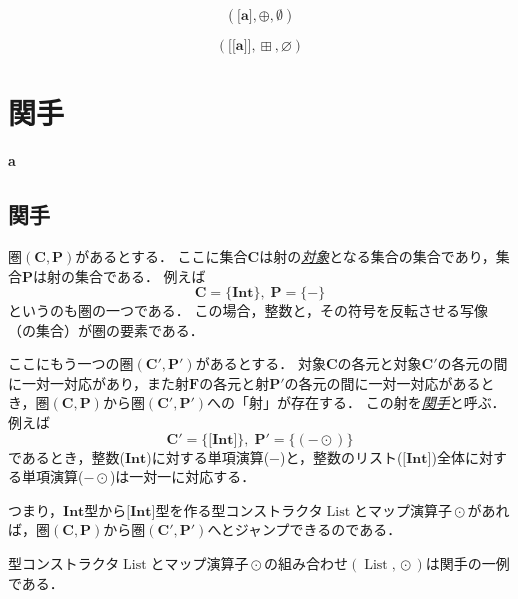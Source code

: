 \documentclass[twocolumn]{jsbook}
\def\[{[\![}
\def\]{]\!]}
\newcommand{\keyword}[1]{\underline{\emph{#1}}}
\newenvironment{leader}{\begingroup\bf}{\endgroup}
\newcommand{\hsklType}[1]{\textbf{#1}}
\newcommand{\hsklTypeConstructor}[1]{\mathop{\mathrm{#1}}}
\DeclareMathOperator{\hsklListConstructor}{\hsklTypeConstructor{List}}
\DeclareMathOperator{\hsklMap}{\odot}
\DeclareMathOperator{\hsklMaybeAppend}{\boxplus}
\newcommand{\hsklAppend}{\oplus}
\newcommand{\hsklEmptyList}{\emptyset}
\newcommand{\hsklInt}{\hsklType{Int}}
\newcommand{\hsklNothing}{\varnothing}
\newcommand{\hsklListType}[1]{\boldsymbol{[}#1\boldsymbol{]}}
\newcommand{\hsklMaybeType}[1]{\boldsymbol{\[}#1\boldsymbol{\]}}
\newcommand{\mathSet}[1]{\mathbf{#1}}
\newcommand{\mathCategoryShort}[2]{(#1,#2)}
\newcommand{\mathMonoid}[3]{(#1,#2,#3)}
\begin{document}
$$\mathMonoid{\hsklListType{\hsklType{a}}}{\hsklAppend}{\hsklEmptyList}$$

$$\mathMonoid{\hsklMaybeType{\hsklType{a}}}{\hsklMaybeAppend}{\hsklNothing}$$





\chapter{関手}
\label{ch:functor}

\begin{leader}
a
\end{leader}


\section{関手}

圏$\mathCategoryShort{\mathSet{C}}{\mathSet{P}}$があるとする．
ここに集合$\mathSet{C}$は射の\keyword{対象}となる集合の集合であり，集合$\mathSet{P}$は射の集合である．
例えば$$\mathSet{C}=\{\hsklInt\},\;\mathSet{P}=\{-\}$$というのも圏の一つである．
この場合，整数と，その符号を反転させる写像（の集合）が圏の要素である．

ここにもう一つの圏$\mathCategoryShort{\mathSet{C}'}{\mathSet{P}'}$があるとする．
対象$\mathSet{C}$の各元と対象$\mathSet{C}'$の各元の間に一対一対応があり，また射$\mathSet{F}$の各元と射$\mathSet{P}'$の各元の間に一対一対応があるとき，圏$\mathCategoryShort{\mathSet{C}}{\mathSet{P}}$から圏$\mathCategoryShort{\mathSet{C}'}{\mathSet{P}'}$への「射」が存在する．
この射を\keyword{関手}と呼ぶ．
例えば$$\mathSet{C}'=\{\hsklListType{\hsklInt}\},\;\mathSet{P}'=\{(-\hsklMap)\}$$であるとき，整数($\hsklInt$)に対する単項演算($-$)と，整数のリスト($\hsklListType{\hsklInt}$)全体に対する単項演算($-\hsklMap$)は一対一に対応する．

つまり，$\hsklInt$型から$\hsklListType{\hsklInt}$型を作る型コンストラクタ$\hsklListConstructor$とマップ演算子$\hsklMap$があれば，圏$\mathCategoryShort{\mathSet{C}}{\mathSet{P}}$から圏$\mathCategoryShort{\mathSet{C}'}{\mathSet{P}'}$へとジャンプできるのである．

型コンストラクタ$\hsklListConstructor$とマップ演算子$\hsklMap$の組み合わせ$(\hsklListConstructor,\hsklMap)$は関手の一例である．
\end{document}
